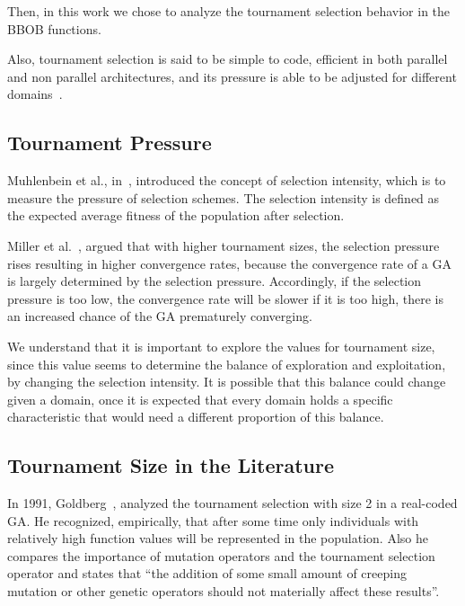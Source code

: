 Then, in this work we chose to analyze the tournament selection behavior in the BBOB functions.


Also, tournament selection is said to be simple to code, efficient in both parallel and non parallel architectures, and its pressure is able to be adjusted for different domains~\cite{miller1995genetic}.



\subsection{Tournament Pressure}\label{sec:background:tournament_pressure} 
Muhlenbein et al., in~\cite{muhlenbein1993predictive}, introduced the concept of selection intensity, which is to measure the pressure of selection schemes. The selection intensity is defined as the expected average fitness of the population after selection.  

Miller et al.~\cite{miller1995genetic}, argued that with higher tournament sizes, the selection pressure rises resulting in higher convergence rates, because the convergence rate of a GA is largely determined by the selection pressure.  Accordingly, if the selection pressure is too low, the convergence rate will be slower if it is too high, there is an increased chance of the GA prematurely converging. 

We understand that it is important to explore the values for tournament size, since this value seems to determine the balance of exploration and exploitation, by changing the selection intensity. It is possible that this balance could change given a domain, once it is expected that every domain holds a specific characteristic that would need a different proportion of this balance.

\subsection{Tournament Size in the Literature}\label{sec:background:tournament_size} 

In 1991, Goldberg~\cite{goldberg1991real}, analyzed the tournament selection with size 2 in a real-coded GA. He recognized, empirically, that after some time only individuals with relatively high function values will be represented in the population. Also he compares the importance of mutation operators and the tournament selection operator and states that ``the addition of some small amount of creeping mutation or other genetic operators should not materially affect these results''.


